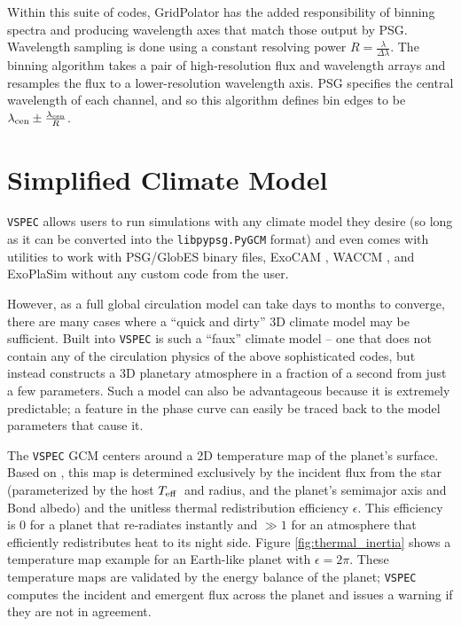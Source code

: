 \documentclass[twocolumn,linenumbers]{aastex631}
\newcommand{\teff}{$T_{\rm eff}$}
\newcommand{\vspec}[1]{\texttt{VSPEC}#1}
\begin{document}
Within this suite of codes, GridPolator has the added responsibility of binning spectra and producing wavelength axes that match those output by PSG. Wavelength sampling is done using a constant resolving power $R=\frac{\lambda}{\Delta \lambda}$. The binning algorithm takes a pair of high-resolution flux and wavelength arrays and resamples the flux to a lower-resolution wavelength axis. PSG specifies the central wavelength of each channel, and so this algorithm defines bin edges to be $\lambda_{\rm cen} \pm \frac{\lambda_{\rm cen}}{R}$.

\section{Simplified Climate Model}
\label{sec:vspec-gcm}
\vspec{} allows users to run simulations with any climate model they desire (so long as it can be converted into the \texttt{libpypsg.PyGCM} format) and even comes with utilities to work with PSG/GlobES binary files, ExoCAM \citep{wolf2022}, WACCM \citep{marsh2013}, and ExoPlaSim \citep{paradise2022} without any custom code from the user.

However, as a full global circulation model can take days to months to converge, there are many cases where a ``quick and dirty'' 3D climate model may be sufficient. Built into \vspec{} is such a ``faux'' climate model -- one that does not contain any of the circulation physics of the above sophisticated codes, but instead constructs a 3D planetary atmosphere in a fraction of a second from just a few parameters. Such a model can also be advantageous because it is extremely predictable; a feature in the phase curve can easily be traced back to the model parameters that cause it.

The \vspec{} GCM centers around a 2D temperature map of the planet's surface. Based on \citet{cowan2011}, this map
is determined exclusively by the incident flux from the star (parameterized by the host \teff~and radius,
and the planet's semimajor axis and Bond albedo) and the unitless thermal redistribution efficiency $\epsilon$.
This efficiency is 0 for a planet that re-radiates instantly and $\gg 1$ for an atmosphere that efficiently redistributes heat to its night side. Figure \ref{fig:thermal_inertia} shows a temperature map example for an Earth-like planet with $\epsilon = 2\pi$. These temperature maps are validated by the energy balance of the planet; \vspec{} computes the incident and emergent flux across the planet and issues a warning if they are not in agreement.
\end{document}
